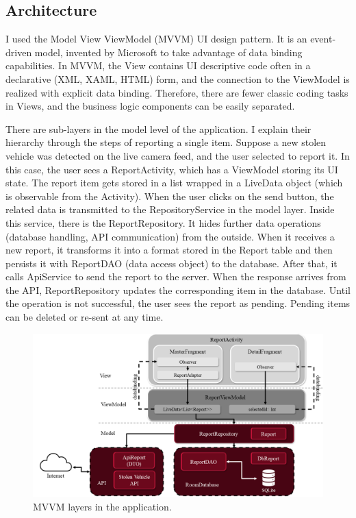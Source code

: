 \subsection{Architecture}

I used the Model View ViewModel (MVVM) UI design pattern. It is an event-driven model, invented by Microsoft to take advantage of data binding capabilities. In MVVM, the View contains UI descriptive code often in a declarative (XML, XAML, HTML) form, and the connection to the ViewModel is realized with explicit data binding. Therefore, there are fewer classic coding tasks in Views, and the business logic components can be easily separated.

There are sub-layers in the model level of the application. I explain their hierarchy through the steps of reporting a single item. Suppose a new stolen vehicle was detected on the live camera feed, and the user selected to report it. In this case, the user sees a ReportActivity, which has a ViewModel storing its UI state. The report item gets stored in a list wrapped in a LiveData object (which is observable from the Activity). When the user clicks on the send button, the related data is transmitted to the RepositoryService in the model layer. Inside this service, there is the ReportRepository. It hides further data operations (database handling, API communication) from the outside. When it receives a new report, it transforms it into a format stored in the Report table and then persists it with ReportDAO (data access object) to the database. After that, it calls ApiService to send the report to the server. When the response arrives from the API, ReportRepository updates the corresponding item in the database. Until the operation is not successful, the user sees the report as pending. Pending items can be deleted or re-sent at any time.

\begin{figure}[htb]
 \centerline{\includegraphics[width=.85\columnwidth]{.//Figure/System/AndroidArchitecture.png}}
 \caption{MVVM layers in the application.}
 \label{fig:simple}
\end{figure}


